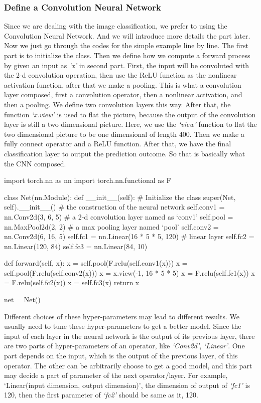 \subsubsection{Define a Convolution Neural Network}
Since we are dealing with the image classification, we prefer to using the Convolution Neural Network. And we will introduce more details the part later. Now we just go through the codes for the simple example line by line.
The first part is to initialize the class. Then we define how we compute a forward process by given an input as \emph{`x'} in second part.  First, the input will be convoluted with the 2-d convolution operation, then use the ReLU function as the nonlinear activation function, after that we make a pooling. This is what a convolution layer composed, first a convolution operator, then a nonlinear activation, and then a pooling. We define two convolution layers this way.  After that, the function \emph{`x.view'} is used to flat the picture, because the output of the convolution layer is still a two dimensional picture. Here, we use the \emph{`view'} function to flat the two dimensional picture to be one dimensional of length 400. Then we make a fully connect operator and a ReLU function. After that, we have the final classification layer to output the prediction outcome. So that is basically what the CNN composed.
\begin{python}
import torch.nn as nn
import torch.nn.functional as F

class Net(nn.Module):
    def __init__(self):  # Initialize the class
        super(Net, self).__init__()
        # the construction of the neural network
        self.conv1 = nn.Conv2d(3, 6, 5) # a 2-d convolution layer named as `conv1'
        self.pool = nn.MaxPool2d(2, 2) # a max pooling layer named `pool'
        self.conv2 = nn.Conv2d(6, 16, 5)
        self.fc1 = nn.Linear(16 * 5 * 5, 120) # linear layer
        self.fc2 = nn.Linear(120, 84)
        self.fc3 = nn.Linear(84, 10)

    def forward(self, x):  
        x = self.pool(F.relu(self.conv1(x))) 
        x = self.pool(F.relu(self.conv2(x))) 
        x = x.view(-1, 16 * 5 * 5)
        x = F.relu(self.fc1(x))
        x = F.relu(self.fc2(x))
        x = self.fc3(x)
        return x


net = Net()
\end{python}
Different choices of these hyper-parameters may lead to different results. We usually need to tune these hyper-parameters to get a better model. 
Since the input of each layer in the neural network is the output of its previous layer, there are two parts of hyper-parameters of an operator, like \emph{`Conv2d'}, \emph{`Linear'}. One part depends on the input, which is the output of the previous layer, of this operator. The other can be arbitrarily choose to get a good model, and this part may decide a part of parameter of the next operator/layer. For example, `Linear(input dimension, output dimension)', the dimension of output of \emph{`fc1'} is 120, then the first parameter of \emph{`fc2'} should be same as it, 120.  

